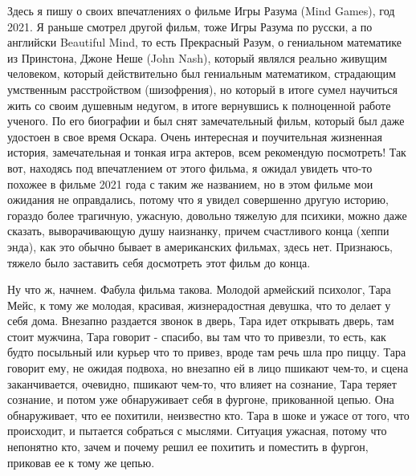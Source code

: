  
 
 
 
 


Здесь я пишу о своих впечатлениях о фильме Игры Разума (Mind Games), год 2021.
Я раньше смотрел другой фильм, тоже Игры Разума по русски, а по английски
Beautiful Mind, то есть Прекрасный Разум, о гениальном математике из Принстона,
Джоне Неше (John Nash), который являлся реально живущим человеком, который
действительно был гениальным математиком, страдающим умственным расстройством
(шизофрения), но который в итоге сумел научиться жить со своим душевным
недугом, в итоге вернувшись к полноценной работе ученого. По его биографии и
был снят замечательный фильм, который был даже удостоен в свое время Оскара.
Очень интересная и поучительная жизненная история, замечательная и тонкая игра
актеров, всем рекомендую посмотреть! Так вот, находясь под впечатлением от
этого фильма, я ожидал увидеть что-то похожее в фильме 2021 года с таким же
названием, но в этом фильме мои ожидания не оправдались, потому что я увидел
совершенно другую историю, гораздо более трагичную, ужасную, довольно тяжелую
для психики, можно даже сказать, выворачивающую душу наизнанку, причем
счастливого конца (хеппи энда), как это обычно бывает в американских фильмах,
здесь нет. Признаюсь, тяжело было заставить себя досмотреть этот фильм до
конца.

Ну что ж, начнем. Фабула фильма такова. Молодой армейский психолог, Тара Мейс,
к тому же молодая, красивая, жизнерадостная девушка, что то делает у себя дома.
Внезапно раздается звонок в дверь, Тара идет открывать дверь, там стоит
мужчина, Тара говорит - спасибо, вы там что то привезли, то есть, как будто
посыльный или курьер что то привез, вроде там речь шла про пиццу. Тара говорит
ему, не ожидая подвоха, но внезапно ей в лицо пшикают чем-то, и сцена
заканчивается, очевидно, пшикают чем-то, что влияет на сознание, Тара теряет
сознание, и потом уже обнаруживает себя в фургоне, прикованной цепью. Она
обнаруживает, что ее похитили, неизвестно кто. Тара в шоке и ужасе от того, что
происходит, и пытается собраться с мыслями. Ситуация ужасная, потому что
непонятно кто, зачем и почему решил ее похитить и поместить в фургон, приковав
ее к тому же цепью.

